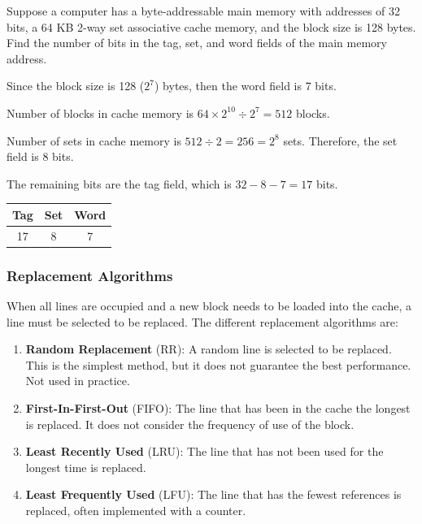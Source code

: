 \begin{example}
    Suppose a computer has a byte-addressable main memory with addresses of 32 bits,
    a 64 KB 2-way set associative cache memory, and the block size is 128 bytes. Find
    the number of bits in the tag, set, and word fields of the main memory address.

    \begin{solution}
    Since the block size is 128 ($2^7$) bytes, then the word field is 7 bits.

    Number of blocks in cache memory is $64 \times 2^{10} \div 2^7 = 512$ blocks.

    Number of sets in cache memory is $512 \div 2 = 256 = 2^8$ sets. Therefore, the set
    field is 8 bits.

    The remaining bits are the tag field, which is $32 - 8 - 7 = 17$ bits.

    \begin{table}[H]
        \centering
        \begin{tabular}{|c|c|c|}
            \hline
            \textbf{Tag} & \textbf{Set} & \textbf{Word} \\ \hline
            17 & 8 & 7 \\ \hline
        \end{tabular}
    \end{table}
    \end{solution}
\end{example}

\subsubsection{Replacement Algorithms}
\label{sec:replacement-algorithms}

When all lines are occupied and a new block needs to be loaded into the cache, a line
must be selected to be replaced. The different replacement algorithms are:
\begin{enumerate}
\item \textbf{Random Replacement} (RR): 
    A random line is selected to be replaced. This is the simplest method, but it
    does not guarantee the best performance. Not used in practice.

\item \textbf{First-In-First-Out} (FIFO):
    The line that has been in the cache the longest is replaced. It does not consider
    the frequency of use of the block.

\item \textbf{Least Recently Used} (LRU):
    The line that has not been used for the longest time is replaced.

\item \textbf{Least Frequently Used} (LFU):
    The line that has the fewest references is replaced, often implemented with a counter.
\end{enumerate}

